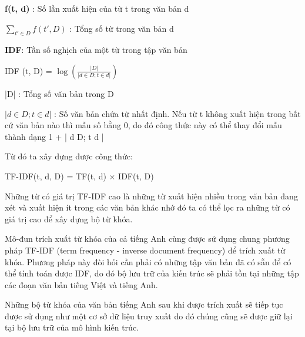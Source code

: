 \documentclass[12pt]{report}
\begin{document}
\textbf{f(t, d)}  : Số lần xuất hiện của từ t trong văn bản d

\textbf{$\sum_{t' \in D} f(t', D)$} : Tổng số từ trong văn bản d 


\textbf{IDF}: Tần số nghịch của một từ trong tập văn bản

\begin{center}
	IDF (t, D) = $\log{(\frac{|D|}{|{ d \in D; t \in d }|})}$
\end{center}

|D| : Tổng số văn bản trong D

$|{ d \in D; t \in d }|$ :  Số văn bản chứa từ nhất định. Nếu từ t không xuất hiện trong bất cứ văn bản nào thì mẫu số bằng 0, do đó công thức này có thể thay đổi mẫu thành dạng 1 + |{ d  D; t  d }|

Từ đó ta xây dựng được công thức:
\begin{center}
	TF-IDF(t, d, D) = TF(t, d) $\times$ IDF(t, D)	
\end{center}

Những từ có giá trị TF-IDF cao là những từ xuất hiện nhiều trong văn bản đang xét và xuất hiện ít trong các văn bản khác nhớ đó ta có thể lọc ra những từ có giá trị cao để xây dựng bộ từ khóa.

Mô-đun trích xuất từ khóa của cả tiếng Anh cùng được sử dụng chung phương pháp TF-IDF (term frequency - inverse document frequency) để trích xuất từ khóa. Phương pháp này đòi hỏi cần phải có những tập văn bản đã có sẵn để có thể tính toán được IDF, do đó bộ lưu trữ của kiến trúc sẽ phải tồn tại những tập các đoạn văn bản tiếng Việt và tiếng Anh.

Những bộ từ khóa của văn bản tiếng Anh sau khi được trích xuất sẽ tiếp tục được sử dụng như một cơ sở dữ liệu truy xuất do đó chúng cũng sẽ được giữ lại tại bộ lưu trữ của mô hình kiến trúc.
\end{document}
